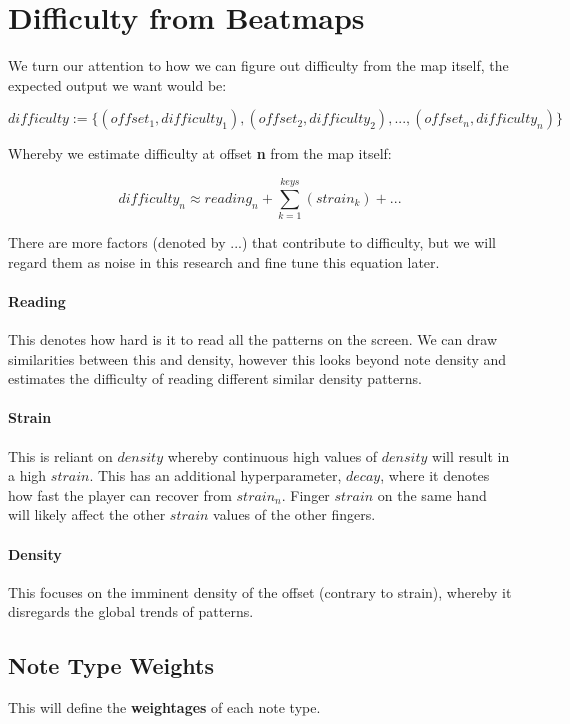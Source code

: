 
\section{Difficulty from Beatmaps}

We turn our attention to how we can figure out difficulty from the map itself, the expected output we want would be:

$$ difficulty := \lbrace(offset_1, difficulty_1), (offset_2, difficulty_2), ..., (offset_n, difficulty_n)\rbrace $$

Whereby we estimate difficulty at offset \textbf{n} from the map itself:

$$ difficulty_n \approx reading_n + \sum_{k=1}^{keys} \left(strain_k \right) + ... $$

There are more factors (denoted by $...$) that contribute to difficulty, but we will regard them as noise in this research and fine tune this equation later.

\paragraph{Reading} This denotes how hard is it to read all the patterns on the screen. We can draw similarities between this and density, however this looks beyond note density and estimates the difficulty of reading different similar density patterns.

\paragraph{Strain} This is reliant on $density$ whereby continuous high values of $ density$ will result in a high $strain$. This has an additional hyperparameter, $decay$, where it denotes how fast the player can recover from $strain_n$. Finger $strain$ on the same hand will likely affect the other $strain$ values of the other fingers.

\paragraph{Density} This focuses on the imminent density of the offset (contrary to strain), whereby it disregards the global trends of patterns.

\subsection{Note Type Weights}

This will define the \textbf{weightages} of each note type.
